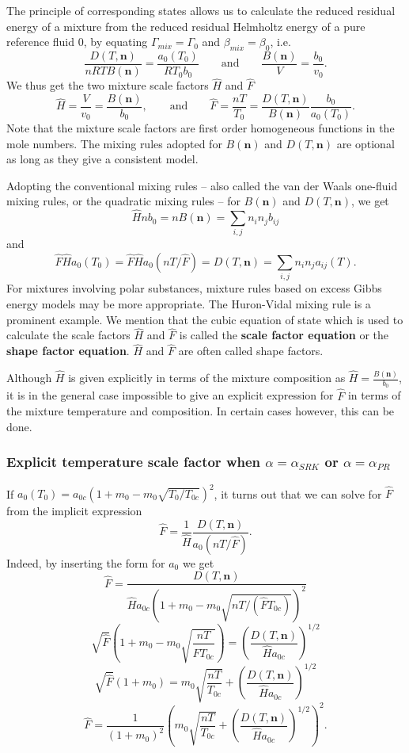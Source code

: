 \documentclass[english]{../thermomemo/thermomemo}
\newcommand{\mbn}[0]{\mathbf n}
\newcommand*{\hF}[0]{\hat F}
\newcommand*{\hH}[0]{\hat H}
\newcommand{\lp}{\left(}
\newcommand{\rp}{\right)}
\numberwithin{equation}{section}
\begin{document}
The principle of corresponding states allows us to calculate the
reduced residual energy of a mixture from the reduced residual
Helmholtz energy of a pure reference fluid $0$, by equating $\Gamma_{mix} =
\Gamma_0$ and $\beta_{mix} = \beta_0$, i.e.
$$
\frac{D(T,\mbn)}{nRTB(\mbn)} = \frac{a_0(T_0)}{RT_0b_0} \qquad \text{and} \qquad
\frac{B(\mbn)}{V} = \frac{b_0}{v_0}.
$$
We thus get the two mixture scale factors $\hat H$ and $\hat F$
$$
\hat H = \frac{V}{v_0} = \frac{B(\mbn)}{b_0}, \qquad \text{and} \qquad \hat
F = \frac{nT}{T_0} = \frac{D(T,\mbn)}{B(\mbn)} \frac{b_0}{a_0(T_0)}.
$$
Note that the mixture scale factors are first order homogeneous
functions in the mole numbers. The mixing rules
adopted for $B(\mbn)$ and $D(T,\mbn)$ are optional as long as they give a consistent
model. %

Adopting the conventional mixing rules -- also called the van der Waals
one-fluid mixing rules, or the quadratic mixing rules -- for $B(\mbn)$ and $D(T,\mbn)$, we get
$$
\hat H n b_0 = nB(\mbn) = \sum_{i,j} n_i n_j b_{ij}
$$
and
$$
\hat F \hat H a_0(T_0) = \hat F \hat H a_0(nT/\hat F) = D(T,\mbn) = \sum_{i,j}
n_i n_j a_{ij}(T).
$$
For mixtures involving polar substances, mixture rules based on excess
Gibbs energy models may be more appropriate. The Huron-Vidal mixing
rule is a prominent example. We mention that the cubic equation of state which is used to calculate the scale
factors $\hH$ and $\hF$ is called the \textbf{scale factor equation}
or the \textbf{shape factor equation}. $\hH$ and $\hF$ are often
called shape factors.

Although $\hH$ is given explicitly in terms of the mixture composition
as $\hat H = \frac{B(\mbn)}{b_0}$, it is in the general case
impossible to give an explicit expression for $\hF$ in terms of the
mixture temperature and composition. In certain cases however, this
can be done.

\subsubsection*{Explicit temperature scale factor when $\alpha=\alpha_{SRK}$ or $\alpha=\alpha_{PR}$}
If $a_0(T_0) = a_{0c} (1+m_0-m_0 \sqrt{T_0/T_{0c}})^2$, it
turns out that we can solve for $\hF$ from the implicit expression
$$
\hat F =  \frac{1}{\hH} \frac{D(T,\mbn)}{a_0(nT/\hF)}.
$$
Indeed, by inserting the form for $a_0$ we get
$$
\hat F = \frac{D(T,\mbn)}{\hH a_{0c} \lp 1+m_0-m_0 \sqrt{nT/(\hF T_{0c})} \rp^2}
$$
$$
\sqrt{\hat F} \lp 1+m_0-m_0 \sqrt{\frac{nT}{\hF T_{0c}}}\rp = \lp
\frac{D(T,\mbn)}{\hH a_{0c}} \rp^{1/2}
$$
$$
\sqrt{\hat F} (1+m_0) = m_0 \sqrt{\frac{nT}{T_{0c}}} +  \lp
\frac{D(T,\mbn)}{\hH a_{0c}} \rp^{1/2}
$$
\begin{equation}
  \label{hF_SRK}
  \hat F = \frac{1}{(1+m_0)^2}\lp m_0 \sqrt{\frac{nT}{T_{0c}}} + \lp
  \frac{D(T,\mbn)}{\hH a_{0c}} \rp^{1/2} \rp^2.
\end{equation}
\end{document}
